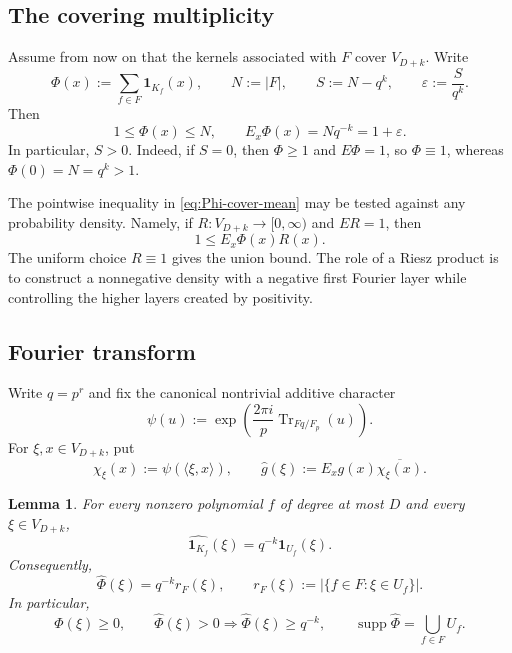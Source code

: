 \documentclass[11pt,reqno]{amsart}
\numberwithin{equation}{section}
\newtheorem{lemma}[lemma]{Lemma}
\theoremstyle{definition}
\theoremstyle{remark}
\DeclareMathOperator{\supp}{supp}
\DeclareMathOperator{\Tr}{Tr}
\newcommand{\Fq}{\mathbb F_q}
\newcommand{\Fp}{\mathbb F_p}
\newcommand{\E}{\mathbb E}
\newcommand{\one}{\mathbf 1}
\newcommand{\cF}{\mathcal F}
\newcommand{\eps}{\varepsilon}
\newcommand{\wh}{\widehat}
\newcommand{\abs}[1]{\lvert#1\rvert}
\newcommand{\angles}[1]{\langle#1\rangle}
\newcommand{\set}[1]{\{#1\}}
\def\Fq{Fq}%
\def\mathbb#1{#1}%
\def\mathcal#1{#1}%
\begin{document}
\subsection{The covering multiplicity}

Assume from now on that the kernels associated with $\cF$ cover $V_{D+k}$.  Write
\begin{equation}\label{eq:Phi-def}
 \Phi(x):=\sum_{f\in\cF}\one_{K_f}(x),
 \qquad
 N:=\abs{\cF},
 \qquad
 S:=N-q^k,
 \qquad
 \eps:=\frac{S}{q^k}.
\end{equation}
Then
\begin{equation}\label{eq:Phi-cover-mean}
 1\le\Phi(x)\le N,
 \qquad
 \E_x\Phi(x)=Nq^{-k}=1+\eps.
\end{equation}
In particular, $S>0$.  Indeed, if $S=0$, then
$\Phi\ge1$ and $\E\Phi=1$, so $\Phi\equiv1$, whereas
$\Phi(0)=N=q^k>1$.

The pointwise inequality in \eqref{eq:Phi-cover-mean} may be tested against any probability density.  Namely, if
$R:V_{D+k}\to[0,\infty)$ and $\E R=1$, then
\begin{equation}\label{eq:probability-density-test}
 1\le\E_x\Phi(x)R(x).
\end{equation}
The uniform choice $R\equiv1$ gives the union bound.  The role of a Riesz product is to construct a nonnegative density with a negative first Fourier layer while controlling the higher layers created by positivity.

\subsection{Fourier transform}

Write $q=p^r$ and fix the canonical nontrivial additive character
\[
 \psi(u):=
 \exp\left(\frac{2\pi i}{p}\Tr_{\Fq/\Fp}(u)\right).
\]
For $\xi,x\in V_{D+k}$, put
\[
 \chi_\xi(x):=\psi(\angles{\xi,x}),
 \qquad
 \wh g(\xi):=\E_xg(x)\overline{\chi_\xi(x)}.
\]

\begin{lemma}\label{lem:fourier-subspace}
For every nonzero polynomial $f$ of degree at most $D$ and every
$\xi\in V_{D+k}$,
\begin{equation}\label{eq:fourier-subspace}
 \wh{\one_{K_f}}(\xi)=q^{-k}\one_{U_f}(\xi).
\end{equation}
Consequently,
\begin{equation}\label{eq:Phi-hat}
 \wh\Phi(\xi)=q^{-k}r_{\cF}(\xi),
 \qquad
 r_{\cF}(\xi):=
 \abs{\set{f\in\cF:\xi\in U_f}}.
\end{equation}
In particular,
\begin{equation}\label{eq:quantisation}
 \wh\Phi(\xi)\ge0,
 \qquad
 \wh\Phi(\xi)>0\Longrightarrow\wh\Phi(\xi)\ge q^{-k},
 \qquad
 \supp\wh\Phi=\bigcup_{f\in\cF}U_f.
\end{equation}
\end{lemma}
\end{document}
